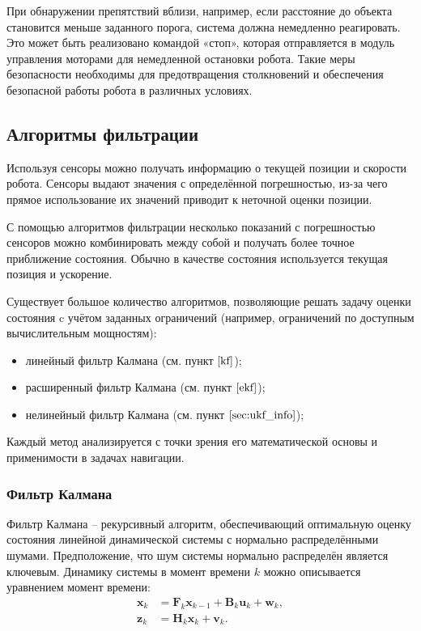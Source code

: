 При обнаружении препятствий вблизи, например, если расстояние до объекта
становится меньше заданного порога, система должна немедленно реагировать. Это
может быть реализовано командой «стоп», которая отправляется в модуль управления
моторами для немедленной остановки робота. Такие меры безопасности необходимы
для предотвращения столкновений и обеспечения безопасной работы робота в
различных условиях.


\subsection{Алгоритмы фильтрации}
Используя сенсоры можно получать информацию о текущей позиции и скорости робота.
Сенсоры выдают значения с определённой погрешностью, из-за чего прямое
использование их значений приводит к неточной оценки позиции.

С помощью алгоритмов фильтрации несколько показаний с погрешностью сенсоров
можно комбинировать между собой и получать более точное приближение состояния.
Обычно в качестве состояния используется текущая позиция и ускорение.

Существует большое количество алгоритмов, позволяющие решать задачу оценки
состояния c учётом заданных ограничений (например, ограничений по доступным
вычислительным мощностям):

\begin{itemize}
	\item линейный фильтр Калмана (см. пункт $\ref{kf}$);
	\item расширенный фильтр Калмана (см. пункт $\ref{ekf}$);
	\item нелинейный фильтр Калмана (см. пункт $\ref{sec:ukf_info}$);
\end{itemize}

Каждый метод анализируется с точки зрения его математической основы и
применимости в задачах навигации.

\subsubsection{Фильтр Калмана}
\label{kf}
Фильтр Калмана -- рекурсивный алгоритм, обеспечивающий оптимальную оценку
состояния линейной динамической системы с нормально распределёнными шумами.
Предположение, что шум системы нормально распределён является ключевым. Динамику
системы в момент времени \( k \) можно описывается уравнением момент времени:
\begin{align}
    \mathbf{x}_k &= \mathbf{F}_k \mathbf{x}_{k-1} + \mathbf{B}_k \mathbf{u}_k + \mathbf{w}_k, \label{eq:kalman_state} \\
    \mathbf{z}_k &= \mathbf{H}_k \mathbf{x}_k + \mathbf{v}_k. \label{eq:kalman_meas}
\end{align}

